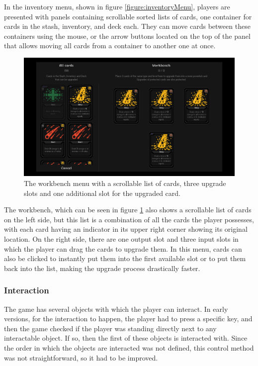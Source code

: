 In the inventory menu, shown in figure \ref{figure:inventoryMenu}, players are presented with panels containing scrollable sorted lists of cards, one container for cards in the stash, inventory, and deck each. They can move cards between these containers using the mouse, or the arrow buttons located on the top of the panel that allows moving all cards from a container to another one at once.

\begin{figure}[h]
    \centering
    \includegraphics[width=\textwidth]{images/workbench.png} 
    \caption{The workbench menu with a scrollable list of cards, three upgrade slots and one additional slot for the upgraded card.}
    \label{figure:workbenchMenu}
\end{figure}

The workbench, which can be seen in figure \ref{figure:workbenchMenu} also shows a scrollable list of cards on the left side, but this list is a combination of all the cards the player possesses, with each card having an indicator in its upper right corner showing its original location. On the right side, there are one output slot and three input slots in which the player can drag the cards to upgrade them. In this menu, cards can also be clicked to instantly put them into the first available slot or to put them back into the list, making the upgrade process drastically faster.



\subsubsection{Interaction}

The game has several objects with which the player can interact. In early versions, for the interaction to happen, the player had to press a specific key, and then the game checked if the player was standing directly next to any interactable object. If so, then the first of these objects is interacted with. Since the order in which the objects are interacted was not defined, this control method was not straightforward, so it had to be improved.

